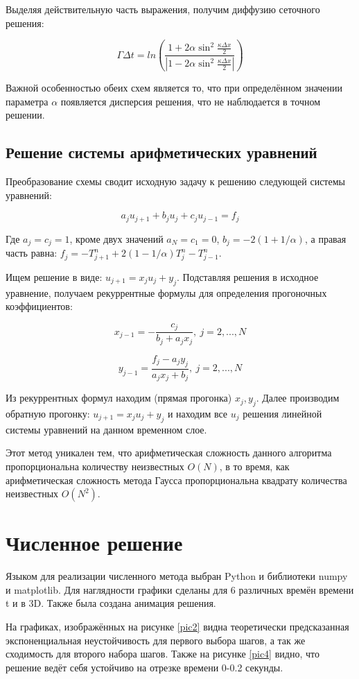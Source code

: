 \documentclass[diploma]{nanolab2015}
\begin{document}
Выделяя действительную часть выражения, получим диффузию сеточного решения:

$$\Gamma \Delta t = ln \left(\frac{1+2 \alpha \sin^2 \frac{\kappa \Delta x}{2}}{|1-2 \alpha \sin^2 \frac{\kappa \Delta x}{2}|}\right)$$

Важной особенностью обеих схем является то, что при определённом значении параметра $\alpha$ появляется дисперсия решения, что не наблюдается в точном решении.

\subsection{Решение системы арифметических уравнений}
Преобразование схемы сводит исходную задачу к решению следующей системы уравнений:

$$a_j u_{j+1} +b_j u_j + c_j u_{j-1}=f_j$$

Где $a_j=c_j=1$, кроме двух значений $a_N=c_1=0$, $b_j=-2(1+1/ \alpha)$, а правая часть равна: $f_j = -T^{n}_{j+1} + 2(1-1/ \alpha)T^{n}_{j}-T^{n}_{j-1}$.

Ищем решение в виде: $u_{j+1} = x_{j}u_{j}+y_{j}$. Подставляя решения в исходное уравнение, получаем рекуррентные формулы для определения прогоночных коэффициентов:

$$x_{j-1} = -\frac{c_j}{b_j+a_j x_j}, \ j=2,...,N$$

$$y_{j-1}=\frac{f_j-a_j y_j}{a_j x_j + b_j}, \ j=2,...,N$$

Из рекуррентных формул находим (прямая прогонка) $x_j, y_j$.  Далее производим обратную прогонку: $u_{j+1} = x_{j}u_{j}+y_{j}$ и находим все $u_j$ решения линейной системы уравнений на данном временном слое.

Этот метод уникален тем, что арифметическая сложность данного алгоритма пропорциональна количеству неизвестных $O(N)$, в то время, как арифметическая сложность метода Гаусса пропорциональна квадрату количества неизвестных $O(N^2)$.

\section{Численное решение}
Языком для реализации численного метода выбран Python и библиотеки numpy и matplotlib. Для наглядности графики сделаны для 6 различных времён времени t и в 3D. Также была создана анимация решения.

На графиках, изображённых на рисунке \ref{pic2} видна теоретически  предсказанная экспоненциальная неустойчивость для первого выбора шагов, а так же сходимость для второго набора шагов. Также на рисунке \ref{pic4} видно, что решение ведёт себя устойчиво на отрезке времени 0-0.2 секунды.
\end{document}
